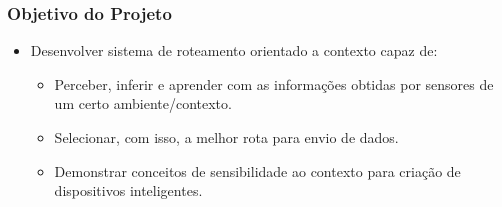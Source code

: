 
\begin{frame}
\titlepage %
\end{frame}



\begin{frame}
\frametitle{Objetivo do Projeto}

\begin{itemize}
	\item Desenvolver sistema de roteamento orientado a contexto capaz de:
	\begin{itemize}
		\item Perceber, inferir e aprender com as informações obtidas por sensores de um certo ambiente/contexto.
		\item Selecionar, com isso, a melhor rota para envio de dados.
		\item Demonstrar conceitos de sensibilidade ao contexto para criação de dispositivos inteligentes.
	\end{itemize}
\end{itemize}
\end{frame}

